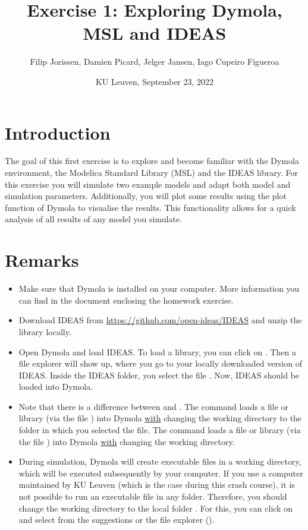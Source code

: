 \documentclass[10pt,a4paper]{article}
\begin{document}
\title{Exercise 1: Exploring Dymola, MSL and IDEAS}
\author{Filip Jorissen, Damien Picard, Jelger Jansen, Iago Cupeiro Figueroa}
\date{KU Leuven, September 23, 2022}
\maketitle


\doclicenseThis


\section*{Introduction}
The goal of this first exercise is to explore and become familiar with the Dymola environment, the Modelica Standard Library (MSL) and the IDEAS library. For this exercise you will simulate two example models and adapt both model and simulation parameters. Additionally, you will plot some results using the plot function of Dymola to visualise the results. This functionality allows for a quick analysis of all results of any model you simulate. 


\section*{Remarks}
 
\begin{itemize}
	\item Make sure that Dymola is installed on your computer. More information you can find in the document enclosing the homework exercise.
	\item Download IDEAS from \href{https://github.com/open-ideas/IDEAS}{https://github.com/open-ideas/IDEAS} and unzip the library locally.
	\item Open Dymola and load IDEAS. To load a library, you can click on . Then a file explorer will show up, where you go to your locally downloaded version of IDEAS. Inside the IDEAS folder, you select the file . Now, IDEAS should be loaded into Dymola.
	\item Note that there is a difference between  and . The command  loads a file or library (via the file ) into Dymola \underline{with} changing the working directory to the folder in which you selected the file. The command  loads a file or library (via the file ) into Dymola \underline{with} changing the working directory.
	\item During simulation, Dymola will create executable files in a working directory, which will be executed subsequently by your computer. If you use a computer maintained by KU Leuven (which is the case during this crash course), it is not possible to run an executable file in any folder. Therefore, you should change the working directory to the local folder . For this, you can click on  and select  from the suggestions or the file explorer ().
\end{itemize}
\end{document}
